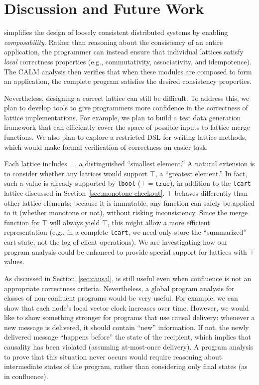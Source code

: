 \section{Discussion and Future Work}
\label{sec:discussion}

\lang simplifies the design of loosely consistent distributed systems by
enabling \emph{composability}. Rather than reasoning about the consistency of an
entire application, the programmer can instead ensure that individual lattices
satisfy \emph{local} correctness properties (e.g., commutativity, associativity,
and idempotence). The CALM analysis then verifies that when these modules are
composed to form an application, the complete program satisfies the desired
consistency properties.

Nevertheless, designing a correct lattice can still be difficult. To address
this, we plan to develop tools to give programmers more confidence in the
correctness of lattice implementations. For example, we plan to build a test
data generation framework that can efficiently cover the space of possible
inputs to lattice merge functions. We also plan to explore a restricted DSL for
writing lattice methods, which would make formal verification of correctness an
easier task.

Each lattice includes $\bot$, a distinguished ``smallest element.'' A natural
extension is to consider whether any lattices would support $\top$, a ``greatest
element.'' In fact, such a value is already supported by \texttt{lbool} ($\top =
\mathtt{true}$), in addition to the \texttt{lcart} lattice discussed in
Section~\ref{sec:monotone-checkout}. $\top$ behaves differently than other
lattice elements: because it is immutable, any function can safely be applied to
it (whether monotone or not), without risking inconsistency. Since the merge
function for $\top$ will always yield $\top$, this might allow a more efficient
representation (e.g., in a complete \texttt{lcart}, we need only store the
``summarized'' cart state, not the log of client operations). We are
investigating how our program analysis could be enhanced to provide special
support for lattices with $\top$ values.

As discussed in Section~\ref{sec:causal}, \lang is still useful even when
confluence is not an appropriate correctness criteria. Nevertheless, a global
program analysis for classes of non-confluent programs would be very useful. For
example, we can show that each node's local vector clock increases over
time. However, we would like to show something stronger for programs that use
causal delivery: whenever a new message is delivered, it should contain ``new''
information. If not, the newly delivered message ``happens before'' the state of
the recipient, which implies that causality has been violated (assuming
at-most-once delivery). A program analysis to prove that this situation never
occurs would require reasoning about intermediate states of the program, rather
than considering only final states (as in confluence).

